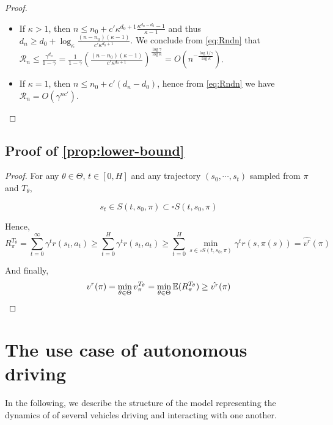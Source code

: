 \documentclass{article}
\begin{document}
\begin{proof}
	\begin{itemize}
		\item If $\kappa > 1$, then $n \leq n_0 + c'\kappa^{d_0+1}\frac{\kappa^{d_n-d_0}-1}{\kappa-1}$ and thus $d_n \geq d_0 + \log_\kappa \frac{(n-n_0)(\kappa - 1)}{c'\kappa^{d_0+1}}$.
		We conclude from \eqref{eq:Rndn} that $\mathcal{R}_n \leq \frac{\gamma^{d_n}}{1-\gamma} = \frac{1}{1-\gamma} \left( \frac{(n-n_0)(\kappa - 1)}{c'\kappa^{d_0+1}} \right)^\frac{\log \gamma}{\log \kappa} = O\left(n^{-\frac{\log 1/\gamma}{\log \kappa}}\right)$.
		
		\item If $\kappa = 1$, then $n \leq n_0 + c'(d_n-d_0)$, hence from \eqref{eq:Rndn} we have $\mathcal{R}_n = O\left(\gamma^{nc'}\right)$.
	\end{itemize}
\end{proof}

\subsection{Proof of \autoref{prop:lower-bound}}

\begin{proof}
	For any $\theta \in \Theta$, $t \in [0, H]$ and any trajectory $(s_0, \cdots, s_t)$ sampled from $\pi$ and $T_\theta$,
	
	\begin{equation*}
	s_t \in S(t, s_0, \pi) \subset \square S(t, s_0, \pi)
	\end{equation*}
	
	Hence, 
	\begin{equation*}
	R^{T_\theta}_\pi = \sum_{t=0}^\infty \gamma^t r(s_t, a_t) \geq \sum_{t=0}^H \gamma^t r(s_t, a_t) \geq \sum_{t=0}^H \min_{s\in \square S(t, s_0, \pi)} \gamma^t r(s, \pi(s)) = \hat{v^r}(\pi)
	\end{equation*}
	
	And finally,
	\begin{align*}
	v^r(\pi) = \min_{\theta\in\Theta} {v_\pi^{T_\theta}} = \min_{\theta\in\Theta} \operatorname*{\mathbb{E}}(R^{T_\theta}_\pi) \geq \hat{v^r}(\pi)
	\end{align*}
\end{proof}


\section{The use case of autonomous driving}

In the following, we describe the structure of the model representing the dynamics of of several vehicles driving and interacting with one another.
\end{document}
